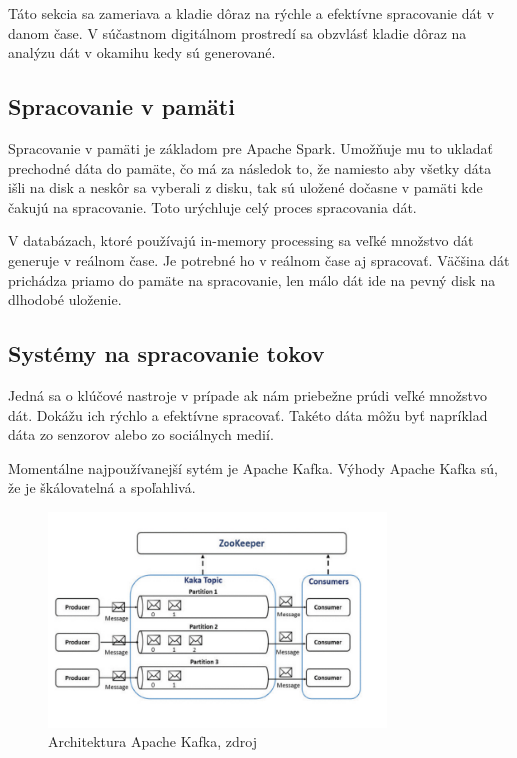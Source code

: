 \documentclass[10pt,twoside,slovak,a4paper]{article}
\begin{document}
Táto sekcia sa zameriava a kladie dôraz na rýchle a efektívne spracovanie dát v danom čase. V súčastnom digitálnom prostredí sa obzvlásť kladie dôraz na analýzu dát v okamihu kedy sú generované.

\subsection {Spracovanie v pamäti} \label{InMemory}

Spracovanie v pamäti je základom pre Apache Spark. Umožňuje mu to ukladať prechodné dáta do pamäte, čo má za následok to, že namiesto aby všetky dáta išli na disk a neskôr sa vyberali z disku, tak sú uložené dočasne v pamäti kde čakujú na spracovanie. Toto urýchluje celý proces spracovania dát.~\cite{Apache}

V databázach, ktoré používajú in-memory processing sa veľké množstvo dát generuje v reálnom čase. Je potrebné ho v reálnom čase aj spracovať. Väčšina dát prichádza priamo do pamäte na spracovanie, len málo dát ide na pevný disk na dlhodobé uloženie. ~\cite{InMemoryArticle}

\subsection {Systémy na spracovanie tokov}

Jedná sa o klúčové nastroje v prípade ak nám priebežne prúdi veľké množstvo dát. Dokážu ich rýchlo a efektívne spracovať. Takéto dáta môžu byť napríklad dáta zo senzorov alebo zo sociálnych medií.

Momentálne najpoužívanejší sytém je Apache Kafka. Výhody Apache Kafka sú, že je škálovatelná a spoľahlivá. ~\cite{ApacheKafka}
\begin{figure}[H]
  \centering
  \includegraphics[width=0.8\textwidth]{ApacheKafka.jpg}
  \caption{Architektura Apache Kafka, zdroj \cite{ApacheKafka}}
  \label{ApacheKafkaObrazok}
\end{figure}
\end{document}
